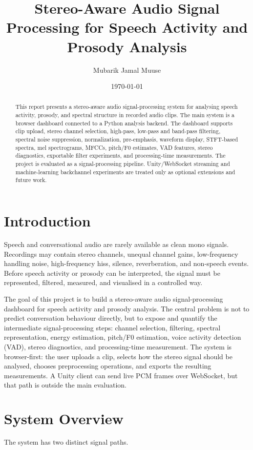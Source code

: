 ﻿\documentclass[11pt,a4paper]{article}
\title{Stereo-Aware Audio Signal Processing for Speech Activity and Prosody Analysis}
\author{Mubarik Jamal Muuse}
\date{\today}
\begin{document}
\maketitle

\begin{abstract}
This report presents a stereo-aware audio signal-processing system for analysing speech activity, prosody, and spectral structure in recorded audio clips. The main system is a browser dashboard connected to a Python analysis backend. The dashboard supports clip upload, stereo channel selection, high-pass, low-pass and band-pass filtering, spectral noise suppression, normalization, pre-emphasis, waveform display, STFT-based spectra, mel spectrograms, MFCCs, pitch/F0 estimates, VAD features, stereo diagnostics, exportable filter experiments, and processing-time measurements. The project is evaluated as a signal-processing pipeline. Unity/WebSocket streaming and machine-learning backchannel experiments are treated only as optional extensions and future work.
\end{abstract}

\section{Introduction}
Speech and conversational audio are rarely available as clean mono signals. Recordings may contain stereo channels, unequal channel gains, low-frequency handling noise, high-frequency hiss, silence, reverberation, and non-speech events. Before speech activity or prosody can be interpreted, the signal must be represented, filtered, measured, and visualised in a controlled way.

The goal of this project is to build a stereo-aware audio signal-processing dashboard for speech activity and prosody analysis. The central problem is not to predict conversation behaviour directly, but to expose and quantify the intermediate signal-processing steps: channel selection, filtering, spectral representation, energy estimation, pitch/F0 estimation, voice activity detection (VAD), stereo diagnostics, and processing-time measurement. The system is browser-first: the user uploads a clip, selects how the stereo signal should be analysed, chooses preprocessing operations, and exports the resulting measurements. A Unity client can send live PCM frames over WebSocket, but that path is outside the main evaluation.

\section{System Overview}
The system has two distinct signal paths.
\end{document}
